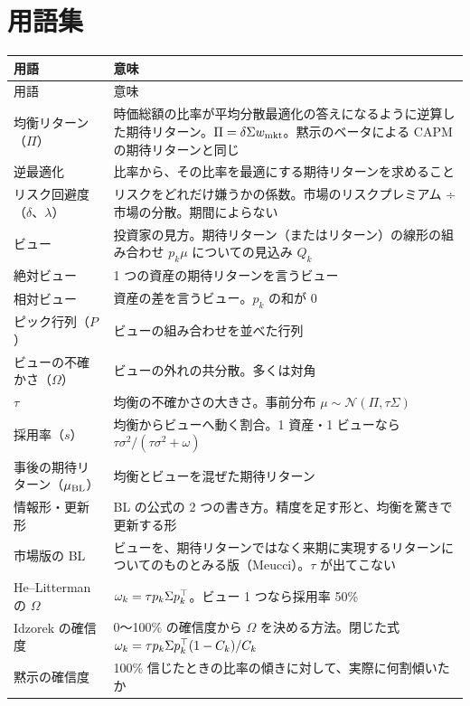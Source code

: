 \chapter{用語集}\label{app:glossary}

\begin{longtable}{p{3.6cm}p{10.0cm}}
\toprule
用語 & 意味 \\
\midrule
\endfirsthead
\toprule
用語 & 意味 \\
\midrule
\endhead
\bottomrule
\endfoot
均衡リターン（$\Pi$） & 時価総額の比率が平均分散最適化の答えになるように逆算した期待リターン。$\Pi=\delta\Sigma w_{\mathrm{mkt}}$。黙示のベータによる CAPM の期待リターンと同じ \\
逆最適化 & 比率から、その比率を最適にする期待リターンを求めること \\
リスク回避度（$\delta$、$\lambda$） & リスクをどれだけ嫌うかの係数。市場のリスクプレミアム ÷ 市場の分散。期間によらない \\
ビュー & 投資家の見方。期待リターン（またはリターン）の線形の組み合わせ $p_k\mu$ についての見込み $Q_k$ \\
絶対ビュー & 1 つの資産の期待リターンを言うビュー \\
相対ビュー & 資産の差を言うビュー。$p_k$ の和が 0 \\
ピック行列（$P$） & ビューの組み合わせを並べた行列 \\
ビューの不確かさ（$\Omega$） & ビューの外れの共分散。多くは対角 \\
$\tau$ & 均衡の不確かさの大きさ。事前分布 $\mu\sim\mathcal N(\Pi,\tau\Sigma)$ \\
採用率（$s$） & 均衡からビューへ動く割合。1 資産・1 ビューなら $\tau\sigma^2/(\tau\sigma^2+\omega)$ \\
事後の期待リターン（$\mu_{\mathrm{BL}}$） & 均衡とビューを混ぜた期待リターン \\
情報形・更新形 & BL の公式の 2 つの書き方。精度を足す形と、均衡を驚きで更新する形 \\
市場版の BL & ビューを、期待リターンではなく来期に実現するリターンについてのものとみる版（Meucci）。$\tau$ が出てこない \\
He--Litterman の $\Omega$ & $\omega_k=\tau p_k\Sigma p_k^{\top}$。ビュー 1 つなら採用率 50\% \\
Idzorek の確信度 & 0〜100\% の確信度から $\Omega$ を決める方法。閉じた式 $\omega_k=\tau p_k\Sigma p_k^{\top}(1-C_k)/C_k$ \\
黙示の確信度 & 100\% 信じたときの比率の傾きに対して、実際に何割傾いたか \\

\end{longtable}
